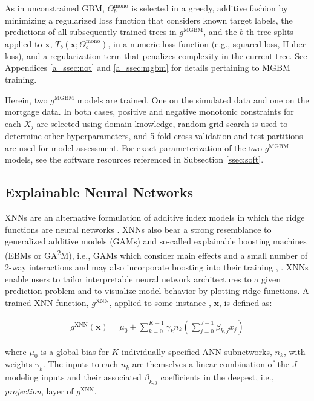 \documentclass[information,article,submit,moreauthors,pdftex]{definitions/mdpi}
\begin{document}
\noindent As in unconstrained GBM, $\Theta^{\text{mono}}_b$ is selected in a greedy, additive fashion by minimizing a regularized loss function that considers known target labels, the predictions of all subsequently trained trees in $g^{\text{MGBM}}$, and the $b$-th tree splits applied to $\mathbf{x}$, $T_b(\mathbf{x};\Theta^\text{mono}_b)$, in a numeric loss function (e.g., squared loss, Huber loss), and a regularization term that penalizes complexity in the current tree. See Appendices \ref{a_ssec:not} and \ref{a_ssec:mgbm} for details pertaining to MGBM training.

Herein, two $g^\text{MGBM}$ models are trained. One on the simulated data and one on the mortgage data. In both cases, positive and negative monotonic constraints for each $X_j$ are selected using domain knowledge, random grid search is used to determine other hyperparameters, and 5-fold cross-validation and test partitions are used for model assessment. For exact parameterization of the two $g^\text{MGBM}$ models, see the software resources referenced in Subsection \ref{ssec:soft}. 

\subsection{Explainable Neural Networks}\label{ssec:xnn}

XNNs are an alternative formulation of additive index models in which the ridge functions are neural networks \cite{wf_xnn}. XNNs also bear a strong resemblance to generalized additive models (GAMs) and so-called explainable boosting machines (EBMs or GA\textsuperscript{2}M), i.e., GAMs which consider main effects and a small number of 2-way interactions and may also incorporate boosting into their training \cite{esl}, \cite{ga2m}. XNNs enable users to tailor interpretable neural network architectures to a given prediction problem and to visualize model behavior by plotting ridge functions. A trained XNN function, $g^{\text{XNN}}$, applied to some instance , $\mathbf{x}$, is defined as:

\begin{equation}
\begin{aligned}
\label{eq:xnn}
g^{\text{XNN}}(\mathbf{x}) = \mu_0 + \sum_{k=0}^{K-1}\gamma_k n_k(\sum^{J-1}_{j=0}\beta_{k, j}x_j)
\end{aligned}
\end{equation}

\noindent where $\mu_0$ is a global bias for $K$ individually specified ANN subnetworks, $n_k$, with weights $\gamma_k$. The inputs to each $n_k$ are themselves a linear combination of the $J$ modeling inputs and their associated $\beta_{k,j}$ coefficients in the deepest, i.e., \textit{projection}, layer of $g^\text{XNN}$. 
\end{document}
